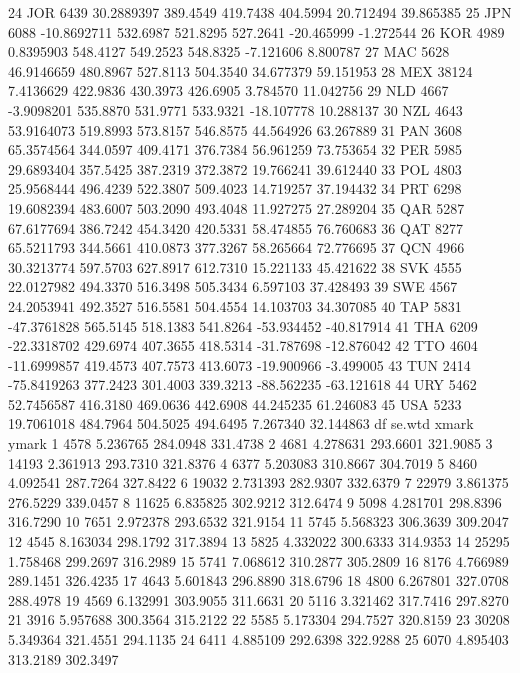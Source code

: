 \documentclass[letterpaper,11pt]{article}
\begin{document}
\begin{Schunk}
\begin{Soutput}
24    JOR  6439  30.2889397 389.4549 419.7438 404.5994  20.712494  39.865385
25    JPN  6088 -10.8692711 532.6987 521.8295 527.2641 -20.465999  -1.272544
26    KOR  4989   0.8395903 548.4127 549.2523 548.8325  -7.121606   8.800787
27    MAC  5628  46.9146659 480.8967 527.8113 504.3540  34.677379  59.151953
28    MEX 38124   7.4136629 422.9836 430.3973 426.6905   3.784570  11.042756
29    NLD  4667  -3.9098201 535.8870 531.9771 533.9321 -18.107778  10.288137
30    NZL  4643  53.9164073 519.8993 573.8157 546.8575  44.564926  63.267889
31    PAN  3608  65.3574564 344.0597 409.4171 376.7384  56.961259  73.753654
32    PER  5985  29.6893404 357.5425 387.2319 372.3872  19.766241  39.612440
33    POL  4803  25.9568444 496.4239 522.3807 509.4023  14.719257  37.194432
34    PRT  6298  19.6082394 483.6007 503.2090 493.4048  11.927275  27.289204
35    QAR  5287  67.6177694 386.7242 454.3420 420.5331  58.474855  76.760683
36    QAT  8277  65.5211793 344.5661 410.0873 377.3267  58.265664  72.776695
37    QCN  4966  30.3213774 597.5703 627.8917 612.7310  15.221133  45.421622
38    SVK  4555  22.0127982 494.3370 516.3498 505.3434   6.597103  37.428493
39    SWE  4567  24.2053941 492.3527 516.5581 504.4554  14.103703  34.307085
40    TAP  5831 -47.3761828 565.5145 518.1383 541.8264 -53.934452 -40.817914
41    THA  6209 -22.3318702 429.6974 407.3655 418.5314 -31.787698 -12.876042
42    TTO  4604 -11.6999857 419.4573 407.7573 413.6073 -19.900966  -3.499005
43    TUN  2414 -75.8419263 377.2423 301.4003 339.3213 -88.562235 -63.121618
44    URY  5462  52.7456587 416.3180 469.0636 442.6908  44.245235  61.246083
45    USA  5233  19.7061018 484.7964 504.5025 494.6495   7.267340  32.144863
      df   se.wtd    xmark    ymark
1   4578 5.236765 284.0948 331.4738
2   4681 4.278631 293.6601 321.9085
3  14193 2.361913 293.7310 321.8376
4   6377 5.203083 310.8667 304.7019
5   8460 4.092541 287.7264 327.8422
6  19032 2.731393 282.9307 332.6379
7  22979 3.861375 276.5229 339.0457
8  11625 6.835825 302.9212 312.6474
9   5098 4.281701 298.8396 316.7290
10  7651 2.972378 293.6532 321.9154
11  5745 5.568323 306.3639 309.2047
12  4545 8.163034 298.1792 317.3894
13  5825 4.332022 300.6333 314.9353
14 25295 1.758468 299.2697 316.2989
15  5741 7.068612 310.2877 305.2809
16  8176 4.766989 289.1451 326.4235
17  4643 5.601843 296.8890 318.6796
18  4800 6.267801 327.0708 288.4978
19  4569 6.132991 303.9055 311.6631
20  5116 3.321462 317.7416 297.8270
21  3916 5.957688 300.3564 315.2122
22  5585 5.173304 294.7527 320.8159
23 30208 5.349364 321.4551 294.1135
24  6411 4.885109 292.6398 322.9288
25  6070 4.895403 313.2189 302.3497

\end{Soutput}
\end{Schunk}
\end{document}
